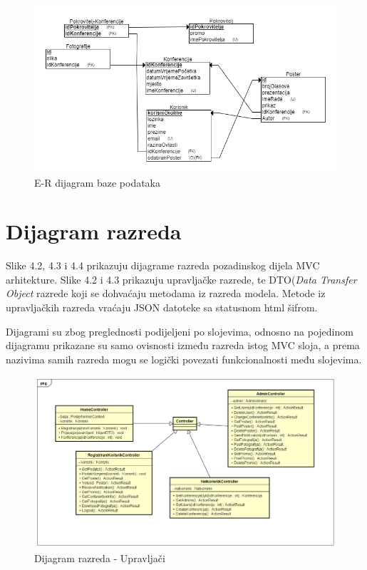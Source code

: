 					\begin{figure} [h]
						\includegraphics[width=\linewidth]{Slike/ERDijagram}
						\caption{E-R dijagram baze podataka}
					\end{figure}
			
			\eject
			
			
		\section{Dijagram razreda}
			
			Slike 4.2, 4.3 i 4.4 prikazuju dijagrame razreda pozadinskog dijela MVC arhitekture. Slike 4.2 i 4.3 prikazuju upravljačke razrede, te DTO(\textit{Data Transfer Object} razrede koji se dohvaćaju metodama iz razreda modela. Metode iz upravljačkih razreda vraćaju JSON datoteke sa statusnom html šifrom.
			
			Dijagrami su zbog preglednosti podijeljeni po slojevima, odnosno na pojedinom dijagramu prikazane su samo ovisnosti između razreda istog MVC sloja, a prema nazivima samih razreda mogu se logički povezati funkcionalnosti među slojevima.
			
			\begin{figure} [h]
				\includegraphics[width=\linewidth]{Slike/ClassDiagramControllers}
				\caption{Dijagram razreda - Upravljači}
			\end{figure}
			
